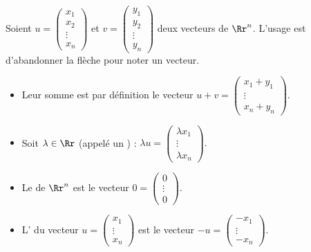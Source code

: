 \documentclass[11pt,class=report,crop=false]{standalone}
\begin{document}
\bigskip

Soient $u = \left(\begin{smallmatrix} x_1\\ x_2\\\vdots \\ x_n \end{smallmatrix}\right)$
et $v =\left(\begin{smallmatrix} y_1\\ y_2\\\vdots \\ y_n \end{smallmatrix}\right)$ deux vecteurs de $\Rr^n$.
L'usage est d'abandonner la flèche pour noter un vecteur.

\begin{definition}
\sauteligne
\begin{itemize}
\item {}
Leur somme est par définition le vecteur $u + v = \begin{pmatrix}x_1 + y_1 \\ \vdots \\ x_n + y_n\end{pmatrix}.$

\item {} Soit $\lambda\in \Rr$
(appelé un ) :
$\lambda  u = \begin{pmatrix}\lambda x_1 \\ \vdots \\ \lambda x_n \end{pmatrix}.$

\item Le  de $\Rr^n$ est le vecteur
$0 = \left(\begin{smallmatrix} 0 \\ \vdots \\ 0 \end{smallmatrix}\right)$.

\item L' du vecteur $u = \left(\begin{smallmatrix} x_1\\ \vdots \\ x_n \end{smallmatrix}\right)$
est le vecteur $-u = \left(\begin{smallmatrix} -x_1\\ \vdots \\ -x_n \end{smallmatrix}\right)$.
\end{itemize}
\end{definition}
\end{document}
